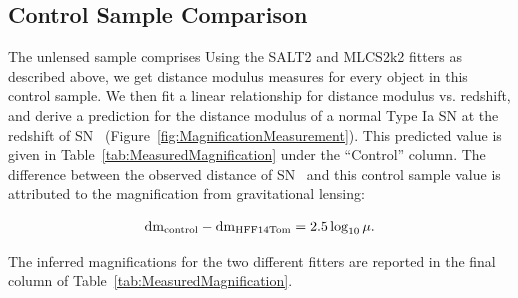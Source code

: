 \subsection{Control Sample Comparison}
\label{sec:ControlSampleComparison}

The unlensed sample comprises   Using the SALT2 and MLCS2k2
fitters as described above, we get distance modulus measures for every
object in this control sample.  We then fit a linear relationship for
distance modulus vs. redshift, and derive a prediction for the
distance modulus of a normal Type Ia SN at the redshift of SN \tomas\
(Figure~\ref{fig:MagnificationMeasurement}).
This predicted value is given in
Table~\ref{tab:MeasuredMagnification} under the ``Control'' column.
The difference between the observed distance of SN \tomas\ and this
control sample value is attributed to the magnification from
gravitational lensing:

\begin{equation} \label{eqn:mu}
{\rm dm}_{\rm control} - {\rm dm}_{\rm HFF14Tom} = 2.5 \log_{10}\mu.
\end{equation}

\noindent The inferred magnifications for the two different fitters are
reported in the final column of Table~\ref{tab:MeasuredMagnification}.

